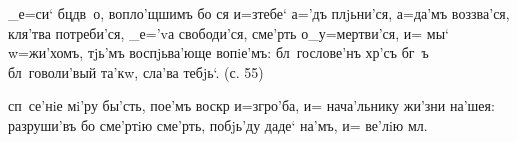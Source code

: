 
   _е=си` бц дв~о, 
вопло'щшимъ бо ся и=з\ъ тебе` а='дъ плjьни'ся, а=да'мъ 
воззва'ся, кля'тва потреби'ся, _е='vа свободи'ся, сме'рть 
о_у=мертви'ся, и= мы` w=жи'хомъ, тjь'мъ воспjьва'юще 
вопiе'мъ: бл~гослове'нъ хр'съ бг~ъ бл~говоли'вый 
та'кw, сла'ва тебjь`. (с. 55)


 сп~се'нiе мi'ру бы'сть, пое'мъ воскр 
и=з\ъ гро'ба, и= нача'льнику жи'зни на'шея: разруши'въ бо 
сме'ртiю сме'рть, побjь'ду даде` на'мъ, и= ве'лiю мл.

